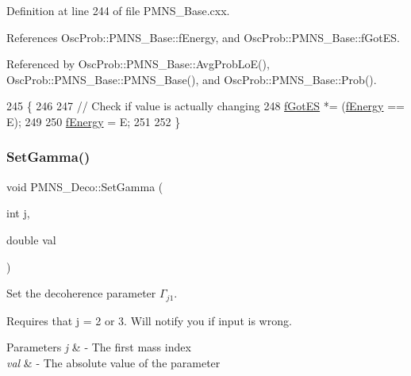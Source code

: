 Definition at line 244 of file P\+M\+N\+S\+\_\+\+Base.\+cxx.



References Osc\+Prob\+::\+P\+M\+N\+S\+\_\+\+Base\+::f\+Energy, and Osc\+Prob\+::\+P\+M\+N\+S\+\_\+\+Base\+::f\+Got\+ES.



Referenced by Osc\+Prob\+::\+P\+M\+N\+S\+\_\+\+Base\+::\+Avg\+Prob\+Lo\+E(), Osc\+Prob\+::\+P\+M\+N\+S\+\_\+\+Base\+::\+P\+M\+N\+S\+\_\+\+Base(), and Osc\+Prob\+::\+P\+M\+N\+S\+\_\+\+Base\+::\+Prob().


\begin{DoxyCode}
245 \{
246 
247   \textcolor{comment}{// Check if value is actually changing}
248   \hyperlink{classOscProb_1_1PMNS__Base_a6dc5cd010d2d70b2324745b4e53e9839}{fGotES} *= (\hyperlink{classOscProb_1_1PMNS__Base_a2800af6d436972f3e900867790c046b0}{fEnergy} == E);
249 
250   \hyperlink{classOscProb_1_1PMNS__Base_a2800af6d436972f3e900867790c046b0}{fEnergy} = E;
251 
252 \}
\end{DoxyCode}
\mbox{\label{classOscProb_1_1PMNS__Deco_ac06a9c503d1c5b4a43c4eb797881898d}} 
\subsubsection{\texorpdfstring{Set\+Gamma()}{SetGamma()}}
{\footnotesize\ttfamily void P\+M\+N\+S\+\_\+\+Deco\+::\+Set\+Gamma (\begin{DoxyParamCaption}\item[{int}]{j,  }\item[{double}]{val }\end{DoxyParamCaption})\hspace{0.3cm}{\ttfamily [virtual]}}

Set the decoherence parameter $\Gamma_{j1}$.

Requires that j = 2 or 3. Will notify you if input is wrong.


\begin{DoxyParams}{Parameters}
{\em j} & -\/ The first mass index \\
\hline
{\em val} & -\/ The absolute value of the parameter \\
\hline
\end{DoxyParams}


